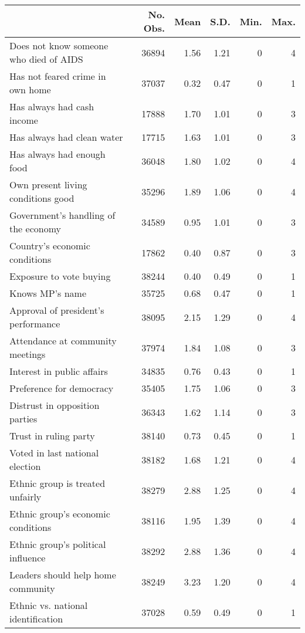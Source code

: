 \begingroup\fontsize{15}{17}\selectfont

\begin{tabular}{l|r|r|r|r|r}
\hline
  & No. Obs. & Mean & S.D. & Min. & Max.\\
\hline
Does not know someone who died of AIDS & 36894 & 1.56 & 1.21 & 0 & 4\\
\hline
Has not feared crime in own home & 37037 & 0.32 & 0.47 & 0 & 1\\
\hline
Has always had cash income & 17888 & 1.70 & 1.01 & 0 & 3\\
\hline
Has always had clean water & 17715 & 1.63 & 1.01 & 0 & 3\\
\hline
Has always had enough food & 36048 & 1.80 & 1.02 & 0 & 4\\
\hline
Own present living conditions good & 35296 & 1.89 & 1.06 & 0 & 4\\
\hline
Government's handling of the economy & 34589 & 0.95 & 1.01 & 0 & 3\\
\hline
Country's economic conditions & 17862 & 0.40 & 0.87 & 0 & 3\\
\hline
Exposure to vote buying & 38244 & 0.40 & 0.49 & 0 & 1\\
\hline
Knows MP's name & 35725 & 0.68 & 0.47 & 0 & 1\\
\hline
Approval of president's performance & 38095 & 2.15 & 1.29 & 0 & 4\\
\hline
Attendance at community meetings & 37974 & 1.84 & 1.08 & 0 & 3\\
\hline
Interest in public affairs & 34835 & 0.76 & 0.43 & 0 & 1\\
\hline
Preference for democracy & 35405 & 1.75 & 1.06 & 0 & 3\\
\hline
Distrust in opposition parties & 36343 & 1.62 & 1.14 & 0 & 3\\
\hline
Trust in ruling party & 38140 & 0.73 & 0.45 & 0 & 1\\
\hline
Voted in last national election & 38182 & 1.68 & 1.21 & 0 & 4\\
\hline
Ethnic group is treated unfairly & 38279 & 2.88 & 1.25 & 0 & 4\\
\hline
Ethnic group's economic conditions & 38116 & 1.95 & 1.39 & 0 & 4\\
\hline
Ethnic group's political influence & 38292 & 2.88 & 1.36 & 0 & 4\\
\hline
Leaders should help home community & 38249 & 3.23 & 1.20 & 0 & 4\\
\hline
Ethnic vs. national identification & 37028 & 0.59 & 0.49 & 0 & 1\\

\end{tabular}
